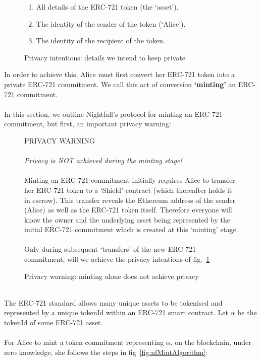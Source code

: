 \documentclass{article}
\begin{document}
\begin{figure}[H]
	\begin{center}
		\begin{framed}
      \begin{enumerate}
        \item All details of the ERC-721 token (the `asset').
        \item The identity of the sender of the token (`Alice').
        \item The identity of the recipient of the token.
      \end{enumerate}
    \end{framed}
  \end{center}
  \caption{Privacy intentions: details we intend to keep private}
  \label{fig:nfPrivacyIntentions}
\end{figure}

\noindent
In order to achieve this, Alice must first convert her ERC-721 token into a private ERC-721 commitment. We call this act of conversion \textbf{`minting'} an ERC-721 commitment.\\
\\
In this section, we outline Nightfall's protocol for minting an ERC-721 commitment, but first, an important privacy warning:

\begin{figure}[H]
  \begin{center}
    \begin{mdframed}[backgroundcolor=verylightred]
      \noindent
      PRIVACY WARNING\\
      \\
      \textit{
      Privacy is NOT achieved during the minting stage!
      }\\
      \\
      Minting an ERC-721 commitment initially requires Alice to transfer her ERC-721 token to a `Shield' contract (which thereafter holds it in escrow). This transfer reveals the Ethereum address of the sender (Alice) as well as the ERC-721 token itself. Therefore everyone will know the owner and the underlying asset being represented by the initial ERC-721 commitment which is created at this `minting' stage.\\
      \\
      Only during subsequent `transfers' of the new ERC-721 commitment, will we achieve the privacy intentions of fig.~\ref{fig:nfPrivacyIntentions}
    \end{mdframed}
  \end{center}
  \caption{Privacy warning: minting alone does not achieve privacy}
  \label{fig:nfMintWarning}
\end{figure}
\ \\
The ERC-721 standard allows many unique assets to be tokenised and represented by a unique tokenId within an ERC-721 smart contract.
Let $\alpha$ be the tokenId of some ERC-721 asset.\\
\\
For Alice to mint a token commitment representing $\alpha$, on the blockchain, under zero knowledge, she follows the steps in fig~\ref{fig:nfMintAlgorithm}:
\end{document}
